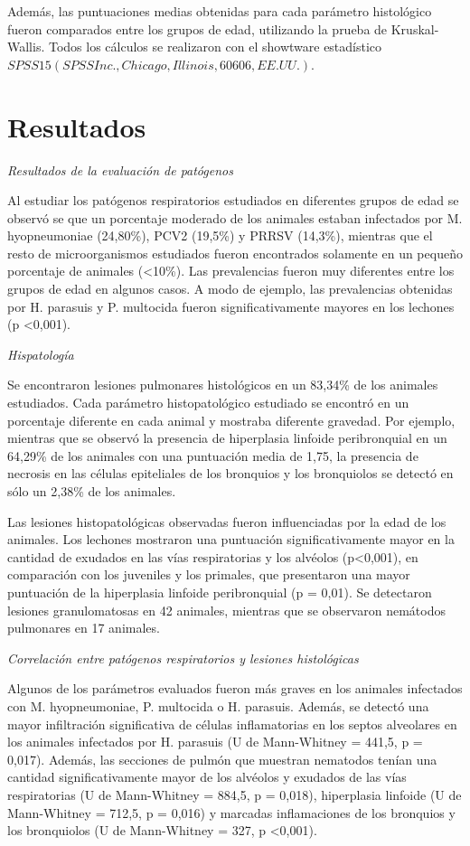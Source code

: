 \documentclass[12pt,a4paper,Spanish]{book}
\begin{document}
Además, las puntuaciones medias obtenidas para cada parámetro histológico fueron comparados entre los grupos de edad, utilizando la prueba de Kruskal-Wallis. Todos los cálculos se realizaron con el showtware estadístico $SPSS 15 (SPSS Inc., Chicago, Illinois, 60606, EE.UU.)$.


\chapter{Resultados}

\textit{Resultados de la evaluación de patógenos}

Al estudiar los patógenos respiratorios estudiados en diferentes grupos de edad se observó se que un porcentaje moderado de los animales estaban infectados por M. hyopneumoniae (24,80\%), PCV2 (19,5\%) y PRRSV (14,3\%), mientras que el resto de microorganismos estudiados fueron encontrados solamente en un pequeño porcentaje de animales (<10\%). Las prevalencias fueron muy diferentes entre los grupos de edad en algunos casos. A modo de ejemplo, las prevalencias obtenidas por H. parasuis y P. multocida fueron significativamente mayores en los lechones (p <0,001).

\textit{Hispatología}

Se encontraron lesiones pulmonares histológicos en un 83,34\% de los animales estudiados. Cada parámetro histopatológico estudiado se encontró en un porcentaje diferente en cada animal y mostraba diferente gravedad. Por ejemplo, mientras que se observó la presencia de hiperplasia linfoide peribronquial en un 64,29\% de los animales con una puntuación media de 1,75, la presencia de necrosis en las células epiteliales de los bronquios y los bronquiolos se detectó en sólo un 2,38\% de los animales. 

Las lesiones histopatológicas observadas fueron influenciadas por la edad de los animales. Los lechones mostraron una puntuación significativamente mayor en la cantidad de exudados en las vías respiratorias y los alvéolos (p<0,001), en comparación con los juveniles y los primales, que presentaron una mayor puntuación de la hiperplasia linfoide peribronquial (p = 0,01). Se detectaron lesiones granulomatosas en 42 animales, mientras que se observaron nemátodos pulmonares en 17 animales.

\textit{Correlación entre patógenos respiratorios y lesiones histológicas}

Algunos de los parámetros evaluados fueron más graves en los animales infectados con M. hyopneumoniae, P. multocida o H. parasuis. Además, se detectó una mayor infiltración significativa de células inflamatorias en los septos alveolares en los animales infectados por H. parasuis (U de Mann-Whitney = 441,5, p = 0,017). Además, las secciones de pulmón que muestran nematodos tenían una cantidad significativamente mayor de los alvéolos y exudados de las vías respiratorias (U de Mann-Whitney = 884,5, p = 0,018), hiperplasia linfoide (U de Mann-Whitney = 712,5, p = 0,016) y marcadas inflamaciones de los bronquios y los bronquiolos (U de Mann-Whitney = 327, p <0,001).
\end{document}
